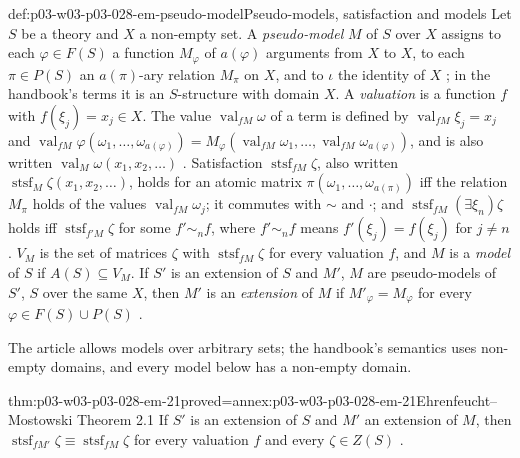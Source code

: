 \begin{hbdefinition}{def:p03-w03-p03-028-em-pseudo-model}{Pseudo-models, satisfaction and models}
Let \(S\) be a theory and \(X\) a non-empty set.  A \emph{pseudo-model} \(M\) of
\(S\) over \(X\) assigns to each \(\varphi\in F(S)\) a function \(M_\varphi\)
of \(a(\varphi)\) arguments from \(X\) to \(X\), to each \(\pi\in P(S)\) an
\(a(\pi)\)-ary relation \(M_\pi\) on \(X\), and to \(\iota\) the identity of
\(X\) \cite[p.~52]{EhrenfeuchtMostowski1956}; in the handbook's terms it is
an \(S\)-structure with domain \(X\).  A \emph{valuation} is a function \(f\)
with \(f(\xi_j)=x_j\in X\).  The value \(\operatorname{val}_{fM}\omega\) of a
term is defined by \(\operatorname{val}_{fM}\xi_j=x_j\) and
\(\operatorname{val}_{fM}\varphi(\omega_1,\ldots,\omega_{a(\varphi)})
=M_\varphi(\operatorname{val}_{fM}\omega_1,\ldots,
\operatorname{val}_{fM}\omega_{a(\varphi)})\), and is also written
\(\operatorname{val}_M\omega(x_1,x_2,\ldots)\)
\cite[pp.~52--53]{EhrenfeuchtMostowski1956}.  Satisfaction
\(\operatorname{stsf}_{fM}\zeta\), also written
\(\operatorname{stsf}_M\zeta(x_1,x_2,\ldots)\), holds for an atomic matrix
\(\pi(\omega_1,\ldots,\omega_{a(\pi)})\) iff the relation \(M_\pi\) holds of
the values \(\operatorname{val}_{fM}\omega_j\); it commutes with
\(\mathord\sim\) and \(\cdot\); and \(\operatorname{stsf}_{fM}(\exists\xi_n)\zeta\)
holds iff \(\operatorname{stsf}_{f'M}\zeta\) for some \(f'\sim_nf\), where
\(f'\sim_nf\) means \(f'(\xi_j)=f(\xi_j)\) for \(j\neq n\)
\cite[p.~53]{EhrenfeuchtMostowski1956}.  \(V_M\) is the set of matrices
\(\zeta\) with \(\operatorname{stsf}_{fM}\zeta\) for every valuation \(f\), and
\(M\) is a \emph{model} of \(S\) if \(A(S)\subseteq V_M\).  If \(S'\) is an
extension of \(S\) and \(M'\), \(M\) are pseudo-models of \(S'\), \(S\) over
the same \(X\), then \(M'\) is an \emph{extension} of \(M\) if
\(M'_\varphi=M_\varphi\) for every \(\varphi\in F(S)\cup P(S)\)
\cite[p.~53]{EhrenfeuchtMostowski1956}.
\end{hbdefinition}

The article allows models over arbitrary sets; the handbook's semantics uses
non-empty domains, and every model below has a non-empty domain.

\begin{hbtheorem}{thm:p03-w03-p03-028-em-21}{proved=annex:p03-w03-p03-028-em-21}{Ehrenfeucht--Mostowski Theorem 2.1}
If \(S'\) is an extension of \(S\) and \(M'\) an extension of \(M\), then
\(\operatorname{stsf}_{fM'}\zeta\equiv\operatorname{stsf}_{fM}\zeta\) for
every valuation \(f\) and every \(\zeta\in Z(S)\)
\cite[Theorem~2.1, p.~53]{EhrenfeuchtMostowski1956}.
\end{hbtheorem}

